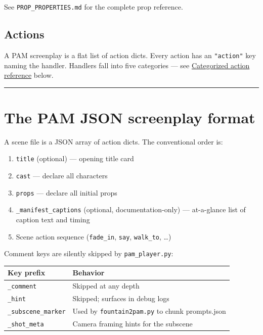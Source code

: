 \documentclass[
  12pt,
  letterpaper,
]{book}
\providecommand{\tightlist}{%
  \setlength{\itemsep}{0pt}\setlength{\parskip}{0pt}}
\begin{document}
See \texttt{PROP\_PROPERTIES.md} for the complete prop reference.

\subsection{Actions}\label{actions}

A PAM screenplay is a flat list of action dicts. Every action has an
\texttt{"action"} key naming the handler. Handlers fall into five
categories --- see \hyperref[categorized-action-reference]{Categorized
action reference} below.

\begin{center}\rule{0.5\linewidth}{0.5pt}\end{center}

\section{The PAM JSON screenplay
format}\label{the-pam-json-screenplay-format}

A scene file is a JSON array of action dicts. The conventional order is:

\begin{enumerate}
\def\labelenumi{\arabic{enumi}.}
\tightlist
\item
  \texttt{title} (optional) --- opening title card
\item
  \texttt{cast} --- declare all characters
\item
  \texttt{props} --- declare all initial props
\item
  \texttt{\_manifest\_captions} (optional, documentation-only) ---
  at-a-glance list of caption text and timing
\item
  Scene action sequence (\texttt{fade\_in}, \texttt{say},
  \texttt{walk\_to}, \ldots)
\end{enumerate}

Comment keys are silently skipped by \texttt{pam\_player.py}:

\begin{longtable}[]{@{}ll@{}}
\toprule\noalign{}
Key prefix & Behavior \\
\midrule\noalign{}
\endhead
\bottomrule\noalign{}
\endlastfoot
\texttt{\_comment} & Skipped at any depth \\
\texttt{\_hint} & Skipped; surfaces in debug logs \\
\texttt{\_subscene\_marker} & Used by \texttt{fountain2pam.py} to chunk
prompts.json \\
\texttt{\_shot\_meta} & Camera framing hints for the subscene \\
\end{longtable}
\end{document}
